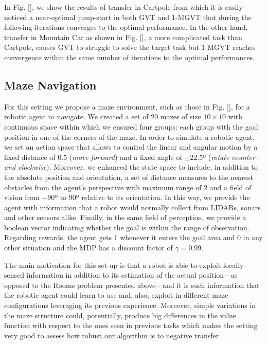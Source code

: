 \documentclass{article}
\begin{document}
In Fig. \ref{}, we show the results of transfer in Cartpole from which it is easily noticed a near-optimal jump-start in both GVT and 1-MGVT that during the following iterations converges to the optimal performance. In the other hand, transfer in Mountain Car as shown in Fig. \ref{}, a more complicated task than Cartpole, causes GVT to struggle to solve the target task but 1-MGVT reaches convergence within the same number of iterations to the optimal performances.


\subsection{Maze Navigation} \label{sec:mn}

For this setting we propose a maze environment, such as those in Fig. \ref{}, for a robotic agent to navigate. We created a set of 20 mazes of size $10\times10$ with continuous space within which we ensured four groups: each group with the goal position in one of the corners of the maze. In order to simulate a robotic agent, we set an action space that allows to control the linear and angular motion by a fixed distance of $0.5$ (\emph{move forward}) and a fixed angle of $\pm 22.5º$ (\emph{rotate counter- and clockwise}). Moreover, we enhanced the state space to include, in addition to the absolute position and orientation, a set of distance measures to the nearest obstacles from the agent's perspective with maximum range of $2$ and a field of vision from $-90º$ to $90º$ relative to its orientation. In this way, we provide the agent with information that a robot would normally collect from LIDARs, sonars and other sensors alike. Finally, in the same field of perception, we provide a boolean vector indicating whether the goal is within the range of observation. Regarding rewards, the agent gets 1 whenever it enters the goal area and 0 in any other situation and the MDP has a discount factor of $\gamma = 0.99$.

The main motivation for this set-up is that a robot is able to exploit locally-sensed information in addition to its estimation of the actual position---as opposed to the Rooms problem presented above---and it is such information that the robotic agent could learn to use and, also, exploit in different maze configurations leveraging its previous experience. Moreover, simple variations in the maze structure could, potentially, produce big differences in the value function with respect to the ones seen in previous tasks which makes the setting very good to assess how robust our algorithm is to negative transfer.
\end{document}
